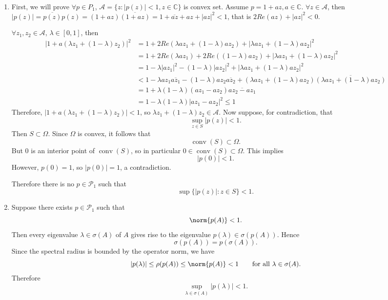\documentclass{ctexart}
\begin{document}
  \begin{solution}
    \begin{enumerate}
      \item First, we will prove \(\forall p \in P_1 \), \(\mathcal{A}=\{z: |p(z)|<1,z \in \mathbb{C}\} \) is convex set.
        Assume \(p=1 + az, a \in \mathbb{C} \). \(\forall z \in \mathcal{A} \), then \(|p(z)| =\overline{p(z)} p(z)=(1 + az)\overline{(1 + az)}=1 + \overline{az} + az + |az|^2<1\), that is \(2 Re(az) + |az|^2 <0\).

        \(\forall z_1,z_2 \in \mathcal{A} \), \(\lambda \in [0,1] \), then
        \begin{equation}
          \begin{aligned}
            |1 + a(\lambda z_1 + (1- \lambda)z_2)|^2&=1 + 2Re(\lambda a z_1 + (1-\lambda ) a z_2) + |\lambda a z_1 + (1- \lambda)a z_2|^2\\
            &=1 + 2Re(\lambda a z_1) + 2 Re((1-\lambda) a z_2) + |\lambda a z_1 + (1- \lambda) a z_2|^2 \\
            &=1 - \lambda |az_1|^2 - (1- \lambda)|az_2|^2 + | \lambda a z_1 + (1-\lambda) a z_2|^2\\
            &<1-\lambda  a z_1 \overline{az_1} - (1-\lambda) az_2 \overline{a z_2} + (\lambda a z_1 + (1- \lambda )a z_2)\overline{(\lambda a z_1 + (1-\lambda)az_2)}\\
            &=1 + \lambda(1-\lambda)(az_1-az_2)\overline{az_2 -az_1}\\
            &=1 - \lambda(1-\lambda)|az_1-az_2|^2 \leq 1
          \end{aligned}
        \end{equation}
        Therefore, \(|1 + a (\lambda z_1 + (1-\lambda) z_2)|<1 \), so \(\lambda z_1 + (1-\lambda)z_2 \in \mathcal{A} \).
        Now suppose, for contradiction, that
        \[
          \sup_{z\in S}|p(z)|<1.
        \]
        Then \(S\subset \Omega\). Since \(\Omega\) is convex, it follows that
        \[
          \operatorname{conv}(S)\subset \Omega.
        \]
        But \(0\) is an interior point of \(\operatorname{conv}(S)\), so in particular
        \(0\in \operatorname{conv}(S)\subset \Omega\). This implies
        \[
          |p(0)|<1.
        \]
        However, \(p(0)=1\), so \(|p(0)|=1\), a contradiction.

        Therefore there is no \(p\in\mathcal{P}_1\) such that
        \[
          \sup\{|p(z)|:z\in S\}<1.
        \]

      \item Suppose there exists \(p\in\mathcal{P}_1\) such that
        \[
          \norm{p(A)}<1.
        \]
        Then every eigenvalue \(\lambda\in \sigma(A)\) of \(A\) gives rise to the
        eigenvalue \(p(\lambda)\in \sigma(p(A))\). Hence
        \[
          \sigma(p(A)) = p(\sigma(A)).
        \]
        Since the spectral radius is bounded by the operator norm, we have
        \[
          |p(\lambda)| \le \rho(p(A)) \le \norm{p(A)} < 1
          \qquad\text{for all }\lambda\in \sigma(A).
        \]
        Therefore
        \[
          \sup_{\lambda\in\sigma(A)} |p(\lambda)| < 1.
        \]


\end{enumerate}
\end{solution}
\end{document}
